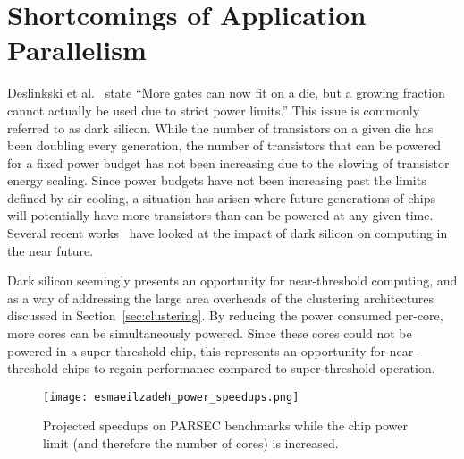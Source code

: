 \section{Shortcomings of Application Parallelism} \label{sec:darksilicon}

Deslinkski et al.~\cite{dreslinski2010near} state ``More gates can now fit on a
die, but a growing fraction cannot actually be used due to strict power
limits.'' This issue is commonly referred to as dark silicon.  While the number
of transistors on a given die has been doubling every generation, the number of
transistors that can be powered for a fixed power budget has not been increasing
due to the slowing of transistor energy scaling. Since power budgets have not
been increasing past the limits defined by air cooling, a situation has arisen
where future generations of chips will potentially have more transistors than
can be powered at any given time.  Several recent
works~\cite{Esmaeilzadeh2011Dark-silicon-an,Hardavellas:2011de} have looked at
the impact of dark silicon on computing in the near future. 

Dark silicon seemingly presents an opportunity for near-threshold computing, and
as a way of addressing the large area overheads of the clustering architectures
discussed in Section~\ref{sec:clustering}. By reducing the power consumed
per-core, more cores can be simultaneously powered. Since these cores could not
be powered in a super-threshold chip, this represents an opportunity for
near-threshold chips to regain performance compared to super-threshold
operation.

\begin{figure}[thpb] \centering
\texttt{[image: esmaeilzadeh\_power\_speedups.png]}
\caption{Projected speedups on PARSEC benchmarks while the chip power limit (and
therefore the number of cores) is
increased.~\cite{Esmaeilzadeh2011Dark-silicon-an}} \label{fig:power_speedups}
\end{figure}

